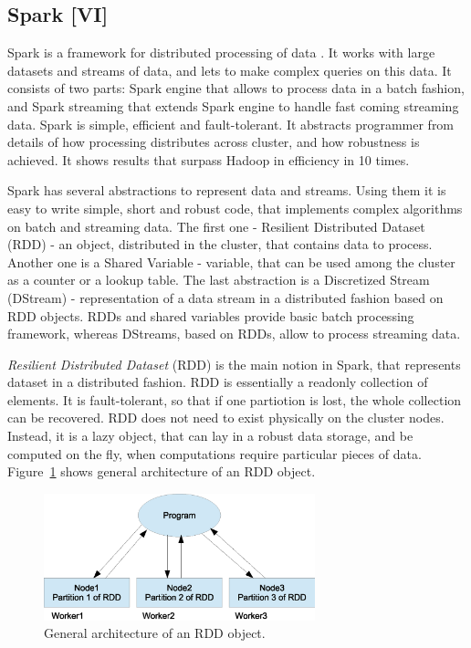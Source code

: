 \subsection{Spark [VI]}

Spark is a framework for distributed processing of data \cite{Zaharia2010, Zaharia2013, Spark1, Spark2}.
It works with large datasets and streams of data, and lets to make complex queries on this data.
It consists of two parts: Spark engine that allows to process data in a batch fashion, and Spark streaming that extends Spark engine to handle fast coming streaming data.
Spark is simple, efficient and fault-tolerant.
It abstracts programmer from details of how processing distributes across cluster, and how robustness is achieved.
It shows results that surpass Hadoop in efficiency in 10 times.

Spark has several abstractions to represent data and streams.
Using them it is easy to write simple, short and robust code, that implements complex algorithms on batch and streaming data.
The first one - Resilient Distributed Dataset (RDD) - an object, distributed in the cluster, that contains data to process.
Another one is a Shared Variable - variable, that can be used among the cluster as a counter or a lookup table.
The last abstraction is a Discretized Stream (DStream) - representation of a data stream in a distributed fashion based on RDD objects.
RDDs and shared variables provide basic batch processing framework, whereas DStreams, based on RDDs, allow to process streaming data.


\textit{Resilient Distributed Dataset}  (RDD) is the main notion in Spark, that represents dataset in a distributed fashion.
RDD is essentially a readonly collection of elements.
It is fault-tolerant, so that if one partiotion is lost, the whole collection can be recovered.
RDD does not need to exist physically on the cluster nodes.
Instead, it is a lazy object, that can lay in a robust data storage, and be computed on the fly, when computations require particular pieces of data.
Figure~\ref{fig:RDDArchitecture} shows general architecture of an RDD object.

\begin{figure}[h]
  \centering
  \includegraphics [width=0.7\textwidth]{images/RDDArchitecture}
  \caption{General architecture of an RDD object.}
  \label{fig:RDDArchitecture}
\end{figure}

